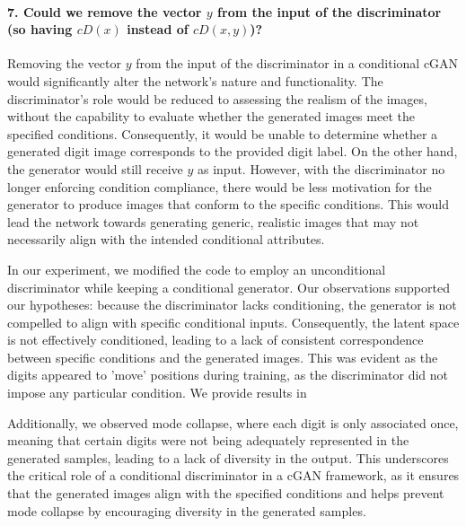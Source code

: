 \paragraph*{7. Could we remove the vector $y$ from the input of the discriminator (so having $cD(x)$ instead of $cD(x, y)$)?}

Removing the vector $y$ from the input of the discriminator in a conditional cGAN would significantly alter the network's nature and functionality. The discriminator's role would be reduced to assessing the realism of the images, without the capability to evaluate whether the generated images meet the specified conditions. Consequently, it would be unable to determine whether a generated digit image corresponds to the provided digit label. On the other hand, the generator would still receive $y$ as input. However, with the discriminator no longer enforcing condition compliance, there would be less motivation for the generator to produce images that conform to the specific conditions. This would lead the network towards generating generic, realistic images that may not necessarily align with the intended conditional attributes.

In our experiment, we modified the code to employ an unconditional discriminator while keeping a conditional generator. Our observations supported our hypotheses: because the discriminator lacks conditioning, the generator is not compelled to align with specific conditional inputs. Consequently, the latent space is not effectively conditioned, leading to a lack of consistent correspondence between specific conditions and the generated images. This was evident as the digits appeared to 'move' positions during training, as the discriminator did not impose any particular condition. We provide results in 

Additionally, we observed mode collapse, where each digit is only associated once, meaning that certain digits were not being adequately represented in the generated samples, leading to a lack of diversity in the output. This underscores the critical role of a conditional discriminator in a cGAN framework, as it ensures that the generated images align with the specified conditions and helps prevent mode collapse by encouraging diversity in the generated samples.

